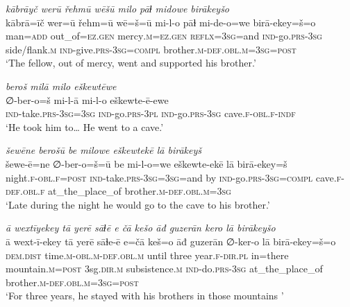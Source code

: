 \ea \label{DG.16}
\textit{kābrāyč werū řehmū wēšū milo pāɫ midowe birākeyšo} \\ 
\gll kābrā=īč wer=ū řehm=ū wē=š=ū mi-l-o pāɫ mi-de-o=we birā-ekey=š=o \\ 
 man\textsc{=add} out\_of\textsc{=ez}\textsc{.gen} mercy\textsc{.m}\textsc{=ez}\textsc{.gen} \textsc{reflx}\textsc{=3sg}=and \textsc{ind-}go\textsc{.prs}\textsc{-3sg} side/flank\textsc{.m} \textsc{ind-}give\textsc{.prs}\textsc{-3sg}\textsc{=\textsc{compl}} brother\textsc{.m}\textsc{-def}\textsc{.obl}\textsc{.m}\textsc{=3sg}\textsc{=\textsc{post}} \\ 
\glt `The fellow, out of mercy, went and supported his brother.'
\z 
 
\ea \label{DG.17}
\textit{beroš milā milo eškewtēwe} \\ 
\gll ∅-ber-o=š mi-l-ā mi-l-o eškewte-ē-ewe \\ 
 \textsc{ind-}take\textsc{.prs}\textsc{-3sg}\textsc{=3sg} \textsc{ind-}go\textsc{.prs}\textsc{-3pl} \textsc{ind-}go\textsc{.prs}\textsc{-3sg} cave\textsc{\textsc{.f}}\textsc{-obl}\textsc{\textsc{.f}}\textsc{-indf} \\ 
\glt `He took him to… He went to a cave.'
\z 
 
\ea \label{DG.19}
\textit{šewēne berošū be milowe eškewtekē lā birākeyš} \\ 
\gll šewe-ē=ne ∅-ber-o=š=ū be mi-l-o=we eškewte-ekē lā birā-ekey=š \\ 
 night\textsc{\textsc{.f}}\textsc{-obl}\textsc{\textsc{.f}}\textsc{=\textsc{post}} \textsc{ind-}take\textsc{.prs}\textsc{-3sg}\textsc{=3sg}=and by \textsc{ind-}go\textsc{.prs}\textsc{-3sg}\textsc{=\textsc{compl}} cave\textsc{\textsc{.f}}\textsc{-def}\textsc{.obl}\textsc{\textsc{.f}} at\_the\_place\_of brother\textsc{.m}\textsc{-def}\textsc{.obl}\textsc{.m}\textsc{=3sg} \\ 
\glt `Late during the night he would go to the cave to his brother.'
\z 
 
\ea \label{DG.21}
\textit{ā wextīyekey tā yerē sāɫē e čā kešo āđ guzerān kero lā birākeyšo} \\ 
\gll ā wext-ī-ekey tā yerē sāɫe-ē e=čā keš=o āđ guzerān ∅-ker-o lā birā-ekey=š=o \\ 
 \textsc{dem.dist} time\textsc{.m}\textsc{-obl}\textsc{.m}\textsc{-def}\textsc{.obl}\textsc{.m} until three year\textsc{\textsc{.f}}\textsc{-dir}\textsc{.pl} in=there mountain\textsc{.m}\textsc{=\textsc{post}} 3sg\textsc{.dir}\textsc{.m} subsistence\textsc{.m} \textsc{ind-}do\textsc{.prs}\textsc{-3sg} at\_the\_place\_of brother\textsc{.m}\textsc{-def}\textsc{.obl}\textsc{.m}\textsc{=3sg}\textsc{=\textsc{post}} \\ 
\glt `For three years, he stayed with his brothers in those mountains '
\z 
 
